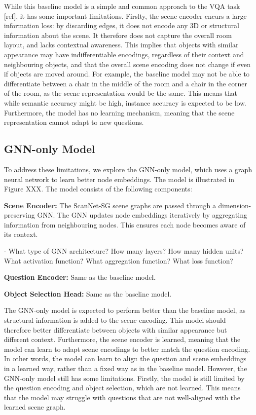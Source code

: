 While this baseline model is a simple and common approach to the VQA task [ref], it has some important limitations. Firslty, the scene encoder encurs a large information loss: by discarding edges, it does not encode any 3D or structural information about the scene. It therefore does not capture the overall room layout, and lacks contextual awareness. This implies that objects with similar appearance may have indifferentiable encodings, regardless of their context and neighbouring objects, and that the overall scene encoding does not change if even if objects are moved around. For example, the baseline model may not be able to differentiate between a chair in the middle of the room and a chair in the corner of the room, as the scene representation would be the same. This means that while semantic accuracy might be high, instance accuracy is expected to be low. Furthermore, the model has no learning mechanism, meaning that the scene representation cannot adapt to new questions.

\subsection{GNN-only Model}
To address these limitations, we explore the GNN-only model, which uses a graph neural network to learn better node embeddings. The model is illustrated in Figure XXX. The model consists of the following components:

\textbf{Scene Encoder:} The ScanNet-SG scene graphs are passed through a dimension-preserving GNN. The GNN updates node embeddings iteratively by aggregating information from neighbouring nodes. This ensures each node becomes aware of its context.

- What type of GNN architecture? How many layers? How many hidden units? What activation function? What aggregation function? What loss function?

\textbf{Question Encoder:} Same as the baseline model.

\textbf{Object Selection Head:} Same as the baseline model.

The GNN-only model is expected to perform better than the baseline model, as structural information is added to the scene encoding. This model should therefore better differentiate between objects with similar appearance but different context. Furthermore, the scene encoder is learned, meaning that the model can learn to adapt scene encodings to better match the question encoding. In other words, the model can learn to align the question and scene embeddings in a learned way, rather than a fixed way as in the baseline model. However, the GNN-only model still has some limitations. Firstly, the model is still limited by the question encoding and object selection, which are not learned. This means that the model may struggle  with questions that are not well-aligned with the learned scene graph.


